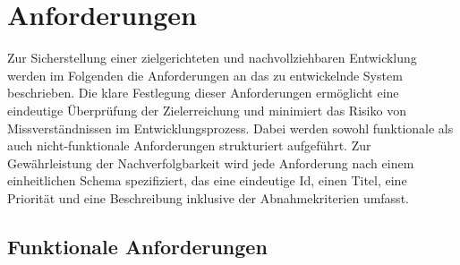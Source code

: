 \chapter{Anforderungen}\label{ch:anforderungen}

Zur Sicherstellung einer zielgerichteten und nachvollziehbaren Entwicklung werden im Folgenden die Anforderungen an das zu entwickelnde System beschrieben.
Die klare Festlegung dieser Anforderungen ermöglicht eine eindeutige Überprüfung der Zielerreichung und minimiert das Risiko von Missverständnissen im Entwicklungsprozess.
Dabei werden sowohl funktionale als auch nicht-funktionale Anforderungen strukturiert aufgeführt.
Zur Gewährleistung der Nachverfolgbarkeit wird jede Anforderung nach einem einheitlichen Schema spezifiziert, das eine eindeutige Id, einen Titel, eine Priorität und eine Beschreibung inklusive der Abnahmekriterien umfasst.




\section{Funktionale Anforderungen}\label{sec:funktionale-anforderungen}

